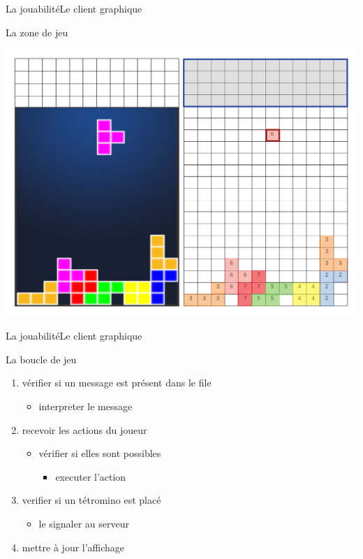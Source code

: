 \documentclass[french]{beamer}
\begin{document}
		\begin{frame}{La jouabilité}{Le client graphique}
			\begin{block}{La zone de jeu}
				\begin{center}
					\includegraphics[scale=0.2]{img/grid.png}
				\end{center}
			\end{block}
		\end{frame}


		\begin{frame}{La jouabilité}{Le client graphique}
			\begin{block}{La boucle de jeu}				
				\begin{enumerate}
					\item vérifier si un message est présent dans le file
						\begin{itemize}
							\item interpreter le message
						\end{itemize}
					\item recevoir les actions du joueur
						\begin{itemize}
							\item vérifier si elles sont possibles
							\begin{itemize}
								\item executer l'action
							\end{itemize}
						\end{itemize}

					\item verifier si un tétromino est placé
						\begin{itemize}
							\item le signaler au serveur
						\end{itemize}

					\item mettre à jour l'affichage
				\end{enumerate}
			\end{block}
		\end{frame}
\end{document}
